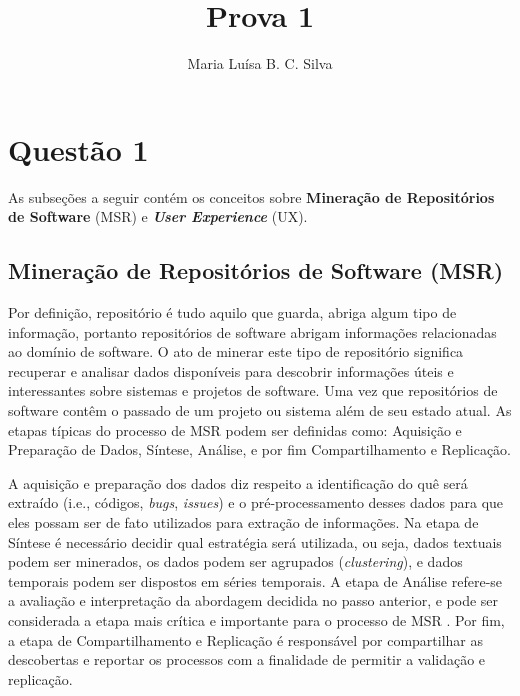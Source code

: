 \documentclass[12pt]{article}
\title{Prova 1}
\author{Maria Luísa B. C. Silva\inst{1}}
\begin{document}
 

\maketitle

\section{Questão 1}
As subseções a seguir contém os conceitos sobre \textbf{Mineração de Repositórios de Software} (MSR) e \textbf{\textit{User Experience}} (UX).

\subsection{Mineração de Repositórios de Software (MSR)}
Por definição, repositório é tudo aquilo que guarda, abriga algum tipo de informação, portanto repositórios de software abrigam informações relacionadas ao domínio de software. O ato de minerar este tipo de repositório significa recuperar e analisar dados disponíveis para descobrir informações úteis e interessantes sobre sistemas e projetos de software. Uma vez que repositórios de software contêm o passado de um projeto ou sistema além de seu estado atual. As etapas típicas do processo de MSR podem ser definidas como: Aquisição e Preparação de Dados, Síntese, Análise, e por fim Compartilhamento e Replicação.

A aquisição e preparação dos dados diz respeito a identificação do quê será extraído (i.e., códigos, \textit{bugs}, \textit{issues}) e o pré-processamento desses dados para que eles possam ser de fato utilizados para extração de informações. Na etapa de Síntese é necessário decidir qual estratégia será utilizada, ou seja, dados textuais podem ser minerados, os dados podem ser agrupados (\textit{clustering}), e dados temporais podem ser dispostos em séries temporais. A etapa de Análise refere-se a avaliação e interpretação da abordagem decidida no passo anterior, e pode ser considerada a etapa mais crítica e importante para o processo de MSR \cite{hemmati2013msr}. Por fim, a etapa de Compartilhamento e Replicação é responsável por compartilhar as descobertas e reportar os processos com a finalidade de permitir a validação e replicação.
\end{document}
